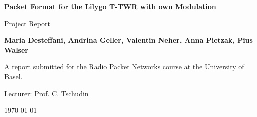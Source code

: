 \begin{titlepage}

    \begin{center}
        \vspace*{1cm}

        \Huge
        \textbf{Packet Format for the Lilygo T-TWR with own Modulation}
        
        \vspace{0.5cm}
        
        \LARGE
        Project Report
        
        \vspace{1.5cm}
        
        \textbf{Maria Desteffani, Andrina Geller, Valentin Neher, Anna Pietzak, Pius Walser}

        \vspace{1.5cm}
        
        \vfill

        \Large
        A report submitted for the Radio Packet Networks course at the University of Basel.

        Lecturer: Prof. C. Tschudin

        \vspace{0.5cm}
        
        \today
        
    \end{center}
    
\end{titlepage}